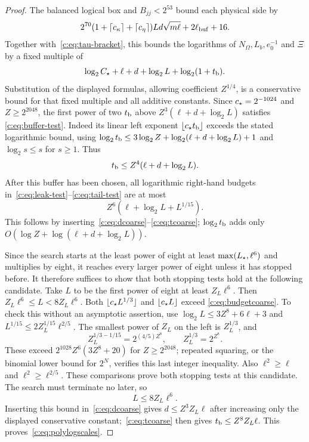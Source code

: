 \begin{proof}
The balanced logical box and $B_{jj}<2^{53}$ bound each physical side
by
\[
 2^{70}(1+\lceil c_\kappa\rceil+\lceil c_\eta\rceil)
 Ld\sqrt{m\ell}+2\ell_{\rm buf}+16.
\]
Together with~\eqref{c:eq:tau-bracket}, this bounds the logarithms of
$N_\Omega,L_b,e_0^{-1}$ and $\Xi$ by a fixed multiple of
\[
 \log_2C_\star+\ell+d+\log_2L+\log_2(1+t_{\rm b}).
\]
Substitution of the displayed formulas, allowing coefficient $Z^{1/4}$,
is a conservative bound for that fixed multiple and all additive
constants. Since $c_\star=2^{-1024}$ and $Z\ge2^{2048}$, the first power
of two $t_{\rm b}$ above $Z^3(\ell+d+\log_2L)$ satisfies
\eqref{c:eq:buffer-test}. Indeed its linear left exponent
$\lfloor c_\star t_{\rm b}\rfloor$ exceeds the stated logarithmic bound, using
$\log_2t_{\rm b}\le3\log_2Z+\log_2(\ell+d+\log_2L)+1$ and
$\log_2s\le s$ for $s\ge1$. Thus
\begin{equation}
 t_{\rm b}\le Z^4(\ell+d+\log_2L).                         \label{c:eq:tcoarse}
\end{equation}
After this buffer has been chosen, all logarithmic right-hand budgets
in~\eqref{c:eq:leak-test}--\eqref{c:eq:tail-test} are at most
\begin{equation}
 Z^6(\ell+\log_2L+L^{1/15}).                        \label{c:eq:budgetcoarse}
\end{equation}
This follows by inserting~\eqref{c:eq:dcoarse}--\eqref{c:eq:tcoarse};
$\log_2t_{\rm b}$ adds only $O(\log Z+\log(\ell+d+\log_2L))$.

Since the search starts at the least power of eight at least
$\max(L_\star,\ell^6)$ and multiplies by eight, it reaches every larger
power of eight unless it has stopped before. It therefore suffices to
show that both stopping tests hold at the following candidate.
Take $L$ to be the first power of eight at least $Z_L\ell^6$.
Then $Z_L\ell^6\le L<8Z_L\ell^6$. Both
$\lfloor c_\star L^{1/3}\rfloor$ and $\lfloor c_\star L\rfloor$ exceed
\eqref{c:eq:budgetcoarse}. To check this without an asymptotic assertion,
use $\log_2L\le3Z^8+6\ell+3$ and
$L^{1/15}\le2Z_L^{1/15}\ell^{2/5}$. The smallest power of $Z_L$
on the left is $Z_L^{1/3}$, and
\[
 Z_L^{1/3-1/15}=2^{(4/5)Z^8},\qquad
 Z_L^{1/3}=2^{Z^8}.
\]
These exceed $2^{1028}Z^6(3Z^8+20)$ for $Z\ge2^{2048}$;
repeated squaring, or the binomial lower bound for $2^N$, verifies
this last integer inequality. Also $\ell^2\ge\ell$ and
$\ell^2\ge\ell^{2/5}$. These comparisons prove both stopping tests
at this candidate. The search must terminate no later, so
\begin{equation}
 L\le8Z_L\ell^6.                                   \label{c:eq:Lexplicit}
\end{equation}
Inserting this bound in~\eqref{c:eq:dcoarse} gives
$d\le Z^3Z_L\ell$ after increasing only the displayed conservative
constant;~\eqref{c:eq:tcoarse} then gives $t_{\rm b}\le Z^8Z_L\ell$.
This proves~\eqref{c:eq:polylogscales}.


\end{proof}
